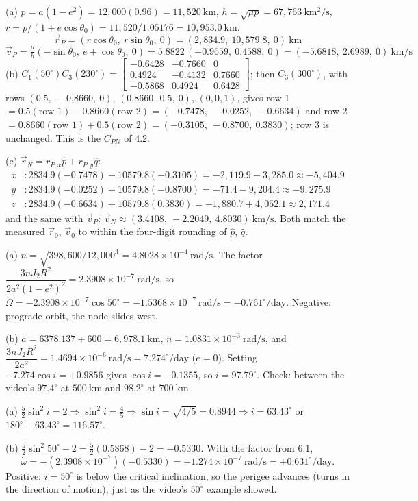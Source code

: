 \documentclass[11pt]{article}
\newcommand{\km}{\ \mathrm{km}}
\newcommand{\kms}{\ \mathrm{km/s}}
\newcommand{\dpd}{^\circ/\mathrm{day}}
\begin{document}
(a) $p = a(1-e^2) = 12{,}000(0.96) = 11{,}520\km$, $h = \sqrt{\mu p} = 67{,}763\ \mathrm{km^2/s}$,
$r = p/(1 + e\cos\theta_0) = 11{,}520/1.05176 = 10{,}953.0\km$.
\[
\vec r_P = (r\cos\theta_0,\ r\sin\theta_0,\ 0) = (2{,}834.9,\ 10{,}579.8,\ 0)\km
\]
\[
\vec v_P = \tfrac{\mu}{h}(-\sin\theta_0,\ e + \cos\theta_0,\ 0) = 5.8822\,(-0.9659,\ 0.4588,\ 0) = (-5.6818,\ 2.6989,\ 0)\kms
\]
(b) $C_1(50^\circ)C_3(230^\circ) = \begin{bmatrix}-0.6428&-0.7660&0\\0.4924&-0.4132&0.7660\\-0.5868&0.4924&0.6428\end{bmatrix}$;
then $C_3(300^\circ)$, with rows $(0.5,\ -0.8660,\ 0)$, $(0.8660,\ 0.5,\ 0)$, $(0,0,1)$, gives row 1
$= 0.5(\text{row }1) - 0.8660(\text{row }2) = (-0.7478,\ -0.0252,\ -0.6634)$ and row 2
$= 0.8660(\text{row }1) + 0.5(\text{row }2) = (-0.3105,\ -0.8700,\ 0.3830)$; row 3 is unchanged. This is the
$C_{PN}$ of 4.2. \checkmark

(c) $\vec r_N = r_{P,x}\hat p + r_{P,y}\hat q$:
\begin{align*}
x &: 2834.9(-0.7478) + 10579.8(-0.3105) = -2{,}119.9 - 3{,}285.0 \approx -5{,}404.9\\
y &: 2834.9(-0.0252) + 10579.8(-0.8700) = -71.4 - 9{,}204.4 \approx -9{,}275.9\\
z &: 2834.9(-0.6634) + 10579.8(0.3830) = -1{,}880.7 + 4{,}052.1 \approx 2{,}171.4
\end{align*}
and the same with $\vec v_P$: $\vec v_N \approx (3.4108,\ -2.2049,\ 4.8030)\kms$. Both match the measured
$\vec r_0$, $\vec v_0$ to within the four-digit rounding of $\hat p$, $\hat q$. \checkmark

(a) $n = \sqrt{398{,}600/12{,}000^3} = 4.8028\times10^{-4}\ \mathrm{rad/s}$. The factor
$\dfrac{3nJ_2R^2}{2a^2(1-e^2)^2} = 2.3908\times10^{-7}\ \mathrm{rad/s}$, so
$\dot\Omega = -2.3908\times10^{-7}\cos 50^\circ = -1.5368\times10^{-7}\ \mathrm{rad/s} = -0.761\dpd$.
Negative: prograde orbit, the node slides west.

(b) $a = 6378.137 + 600 = 6{,}978.1\km$, $n = 1.0831\times10^{-3}\ \mathrm{rad/s}$, and
$\dfrac{3nJ_2R^2}{2a^2} = 1.4694\times10^{-6}\ \mathrm{rad/s} = 7.274\dpd$ ($e = 0$). Setting
$-7.274\cos i = +0.9856$ gives $\cos i = -0.1355$, so $i = 97.79^\circ$. Check: between the video's
$97.4^\circ$ at $500\km$ and $98.2^\circ$ at $700\km$. \checkmark

(a) $\tfrac52\sin^2 i = 2 \Rightarrow \sin^2 i = \tfrac45 \Rightarrow \sin i = \sqrt{4/5} = 0.8944
\Rightarrow i = 63.43^\circ$ or $180^\circ - 63.43^\circ = 116.57^\circ$.

(b) $\tfrac52\sin^2 50^\circ - 2 = \tfrac52(0.5868) - 2 = -0.5330$. With the factor from 6.1,
\[
\dot\omega = -(2.3908\times10^{-7})(-0.5330) = +1.274\times10^{-7}\ \mathrm{rad/s} = +0.631\dpd .
\]
Positive: $i = 50^\circ$ is below the critical inclination, so the perigee advances (turns in the direction of
motion), just as the video's $50^\circ$ example showed.
\end{document}

